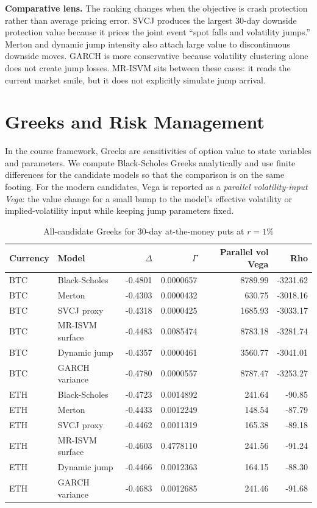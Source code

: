 \documentclass[11pt]{article}
\begin{document}
\textbf{Comparative lens.} The ranking changes when the objective is crash protection rather than average pricing error. SVCJ produces the largest 30-day downside protection value because it prices the joint event ``spot falls and volatility jumps.'' Merton and dynamic jump intensity also attach large value to discontinuous downside moves. GARCH is more conservative because volatility clustering alone does not create jump losses. MR-ISVM sits between these cases: it reads the current market smile, but it does not explicitly simulate jump arrival.

\section{Greeks and Risk Management}

In the course framework, Greeks are sensitivities of option value to state variables and parameters. We compute Black-Scholes Greeks analytically and use finite differences for the candidate models so that the comparison is on the same footing. For the modern candidates, Vega is reported as a \emph{parallel volatility-input Vega}: the value change for a small bump to the model's effective volatility or implied-volatility input while keeping jump parameters fixed.

\begin{table}[H]
\centering
\caption{All-candidate Greeks for 30-day at-the-money puts at $r=1\%$}
\small
\begin{tabular}{llrrrr}
\toprule
Currency & Model & $\Delta$ & $\Gamma$ & Parallel vol Vega & Rho\\
\midrule
BTC & Black-Scholes & -0.4801 & 0.0000657 & 8789.99 & -3231.62\\
BTC & Merton & -0.4303 & 0.0000432 & 630.75 & -3018.16\\
BTC & SVCJ proxy & -0.4318 & 0.0000425 & 1685.93 & -3033.17\\
BTC & MR-ISVM surface & -0.4483 & 0.0085474 & 8783.18 & -3281.74\\
BTC & Dynamic jump & -0.4357 & 0.0000461 & 3560.77 & -3041.01\\
BTC & GARCH variance & -0.4780 & 0.0000557 & 8787.47 & -3253.27\\
ETH & Black-Scholes & -0.4723 & 0.0014892 & 241.64 & -90.85\\
ETH & Merton & -0.4433 & 0.0012249 & 148.54 & -87.79\\
ETH & SVCJ proxy & -0.4462 & 0.0011319 & 165.38 & -89.18\\
ETH & MR-ISVM surface & -0.4603 & 0.4778110 & 241.56 & -91.24\\
ETH & Dynamic jump & -0.4466 & 0.0012363 & 164.15 & -88.30\\
ETH & GARCH variance & -0.4683 & 0.0012685 & 241.46 & -91.68\\
\bottomrule
\end{tabular}
\end{table}
\end{document}
